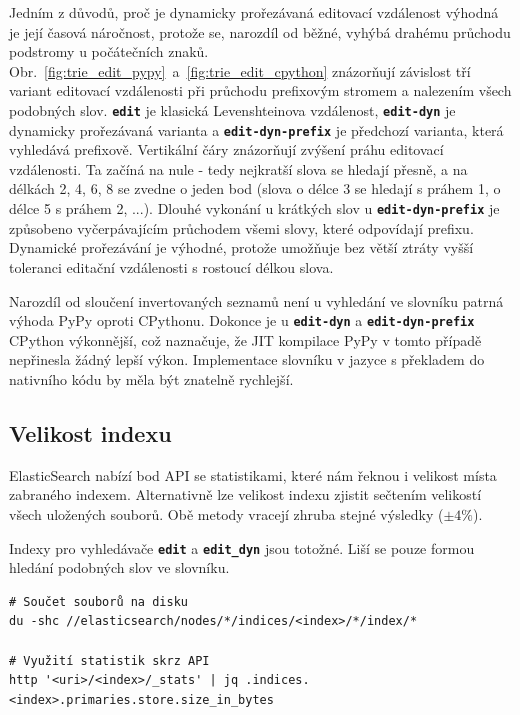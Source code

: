 \documentclass[11pt,letterpaper,oneside,openright]{book}
\newcommand{\bftt}[1]{\texttt{\textbf{#1}}}
\begin{document}
Jedním z důvodů, proč je dynamicky prořezávaná editovací vzdálenost výhodná je
její časová náročnost, protože se, narozdíl od běžné, vyhýbá drahému průchodu
podstromy u počátečních znaků.
Obr.~\ref{fig:trie_edit_pypy}~a~\ref{fig:trie_edit_cpython} znázorňují
závislost tří variant editovací vzdálenosti při průchodu prefixovým stromem a
nalezením všech podobných slov. \bftt{edit} je klasická Levenshteinova
vzdálenost, \bftt{edit-dyn} je dynamicky prořezávaná varianta a
\bftt{edit-dyn-prefix} je předchozí varianta, která vyhledává prefixově.
Vertikální čáry znázorňují zvýšení práhu editovací vzdálenosti. Ta začíná na
nule - tedy nejkratší slova se hledají přesně, a na délkách 2, 4, 6, 8 se
zvedne o jeden bod (slova o délce 3 se hledají s práhem 1, o délce 5 s práhem
2, ...). Dlouhé vykonání u krátkých slov u \bftt{edit-dyn-prefix} je způsobeno
vyčerpávajícím průchodem všemi slovy, které odpovídají prefixu. Dynamické
prořezávání je výhodné, protože umožňuje bez větší ztráty vyšší toleranci
editační vzdálenosti s rostoucí délkou slova.

Narozdíl od sloučení invertovaných seznamů není u vyhledání ve slovníku patrná
výhoda PyPy oproti CPythonu. Dokonce je u \bftt{edit-dyn} a
\bftt{edit-dyn-prefix} CPython výkonnější, což naznačuje, že JIT kompilace PyPy
v tomto případě nepřinesla žádný lepší výkon. Implementace slovníku v jazyce s
překladem do nativního kódu by měla být znatelně rychlejší.



\subsection{Velikost indexu}
ElasticSearch nabízí bod API se statistikami, které nám řeknou i velikost místa
zabraného indexem. Alternativně lze velikost indexu zjistit sečtením velikostí
všech uložených souborů. Obě metody vracejí zhruba stejné výsledky ($\pm 4\%$).

Indexy pro vyhledávače \bftt{edit} a \bftt{edit\_dyn} jsou totožné. Liší se
pouze formou hledání podobných slov ve slovníku.

\begin{Verbatim}
# Součet souborů na disku
du -shc //elasticsearch/nodes/*/indices/<index>/*/index/*

# Využití statistik skrz API
http '<uri>/<index>/_stats' | jq .indices.<index>.primaries.store.size_in_bytes
\end{Verbatim}
\end{document}
